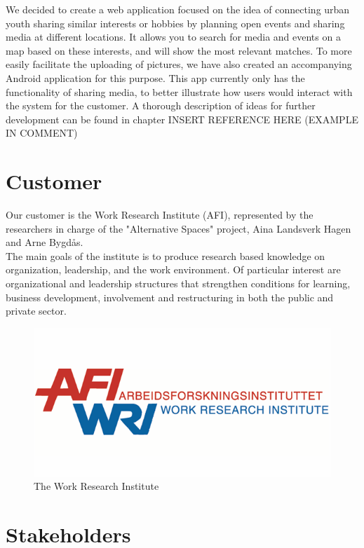 We decided to create a web application focused on the idea of connecting urban youth sharing similar interests or hobbies by planning open events and sharing media at different locations. It allows you to search for media and events on a map based on these interests, and will show the most relevant matches. To more easily facilitate the uploading of pictures, we have also created an accompanying Android application for this purpose. This app currently only has the functionality of sharing media, to better illustrate how users would interact with the system for the customer. A thorough description of ideas for further development can be found in chapter INSERT REFERENCE HERE (EXAMPLE IN COMMENT) %


\section{Customer}
\label{sec:IntroCustomer}

Our customer is the Work Research Institute (AFI), represented by the researchers in charge of the "Alternative Spaces" project, Aina Landsverk Hagen and Arne Bygdås. \\
The main goals of the institute is to produce research based knowledge on organization, leadership, and the work environment. Of particular interest are organizational and leadership structures that strengthen conditions for learning, business development, involvement and restructuring in both the public and private sector.

\begin{figure}[ht!]
\centering
\includegraphics[width=\linewidth]{./Introduction/img/afi}
\caption{The Work Research Institute \label{fig:IntroAfi}}
\end{figure}

\section{Stakeholders}
\label{sec:IntroStakeholders}

